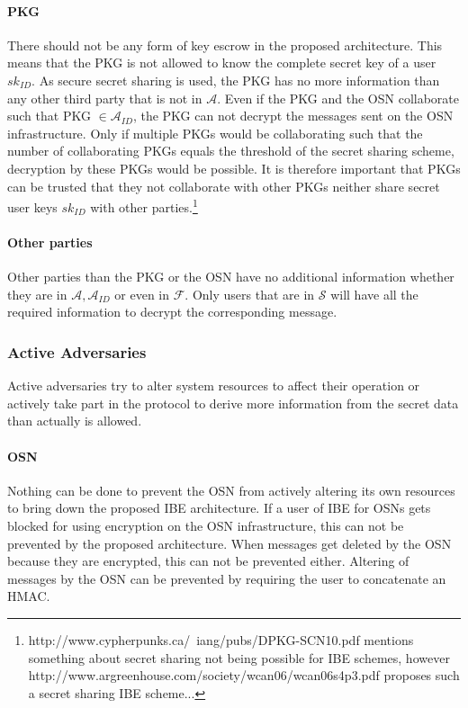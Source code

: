 \documentclass[12pt,openany]{article}
\begin{document}
\paragraph{PKG} There should not be any form of key escrow in the proposed
architecture. This means that the PKG is not allowed to know the complete
secret key of a user $sk_{ID}$. As secure secret sharing is used, the PKG has no
more information than any other third party that is not in $\mathcal{A}$. Even
if the PKG and the OSN collaborate such that PKG $\in \mathcal{A}_{ID}$, the PKG
can not decrypt the messages sent on the OSN infrastructure. Only if multiple
PKGs would be collaborating such that the number of collaborating PKGs equals
the threshold of the secret sharing scheme, decryption by these PKGs would be
possible. It is therefore important that PKGs can be trusted that they not
collaborate with other PKGs neither share secret user keys
$sk_{ID}$ with other
parties.\footnote{http://www.cypherpunks.ca/~iang/pubs/DPKG-SCN10.pdf mentions
something about secret sharing not being possible for IBE schemes, however
http://www.argreenhouse.com/society/wcan06/wcan06s4p3.pdf proposes such a secret
sharing IBE scheme...}

\paragraph{Other parties} Other parties than the PKG or the OSN have no
additional information whether they are in $\mathcal{A}, \mathcal{A}_{ID}$ or
even in $\mathcal{F}$. Only users that are in $\mathcal{S}$ will have all the
required information to decrypt the corresponding message.

\subsubsection{Active Adversaries}
Active adversaries try to alter system resources to affect their operation or
actively take part in the protocol to derive more information from the secret
data than actually is allowed.

\paragraph{OSN} Nothing can be done to prevent the OSN from actively altering
its own resources to bring down the proposed IBE architecture. If a user of IBE
for OSNs gets blocked for using encryption on the OSN infrastructure, this can
not be prevented by the proposed architecture. When messages get deleted by the
OSN because they are encrypted, this can not be prevented either. Altering of
messages by the OSN can be prevented by requiring the user to concatenate an
HMAC.
\end{document}
